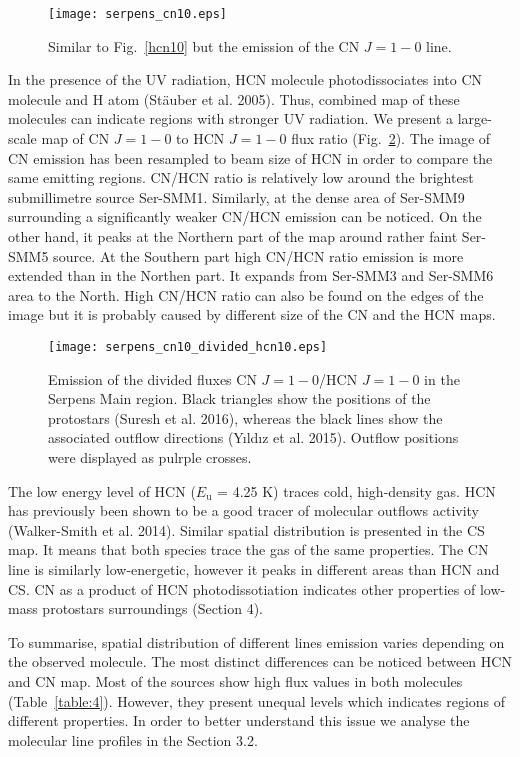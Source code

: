 \documentclass{aa}
\begin{document}
\begin{figure}
\texttt{[image: serpens\_cn10.eps]}
\caption{Similar to Fig.~\ref{hcn10} but the emission of the CN $J=1-0$ line.}
\label{cn10}
\end{figure}

In the presence of the UV radiation, HCN molecule photodissociates into CN molecule and H atom (Stäuber et al. 2005). Thus, combined map of these molecules can indicate regions with stronger UV radiation. We present a large-scale map of CN $J=1-0$ to HCN $J=1-0$ flux ratio (Fig.~\ref{cn10_div_hcn10}). The image of CN emission has been resampled to beam size of HCN in order to compare the same emitting regions. CN/HCN ratio is relatively low around the brightest submillimetre source Ser-SMM1. Similarly, at the dense area of Ser-SMM9 surrounding a significantly weaker CN/HCN emission can be noticed. On the other hand, it peaks at the Northern part of the map around rather faint Ser-SMM5 source. At the Southern part high CN/HCN ratio emission is more extended than in the Northen part. It expands from Ser-SMM3 and Ser-SMM6 area to the North. High CN/HCN ratio can also be found on the edges of the image but it is probably caused by different size of the CN and the HCN maps.

\begin{figure}
   \centering
   \texttt{[image: serpens\_cn10\_divided\_hcn10.eps]}
      \caption{Emission of the divided fluxes CN $J=1-0$/HCN $J=1-0$ in the Serpens Main region. Black triangles show the positions of the protostars (Suresh et al. 2016), whereas the black lines show the associated outflow directions (Y{\i}ld{\i}z et al. 2015). Outflow positions were displayed as pulrple crosses.}
         \label{cn10_div_hcn10}
   \end{figure}

The low energy level of HCN ($E_\mathrm{u}$ = 4.25 K) traces cold, high-density gas. HCN has previously been shown to be a good tracer of molecular outflows activity (Walker-Smith et al. 2014). Similar spatial distribution is presented in the CS map. It means that both species trace the gas of the same properties. The CN line is similarly low-energetic, however it peaks in different areas than HCN and CS. CN as a product of HCN photodissotiation indicates other properties of low-mass protostars surroundings (Section 4).

To summarise, spatial distribution of different lines emission varies depending on the observed molecule. The most distinct differences can be noticed between HCN and CN map. Most of the sources show high flux values in both molecules (Table~\ref{table:4}). However, they present unequal levels which indicates regions of different properties. In order to better understand this issue we analyse the molecular line profiles in the Section 3.2. 
\end{document}
